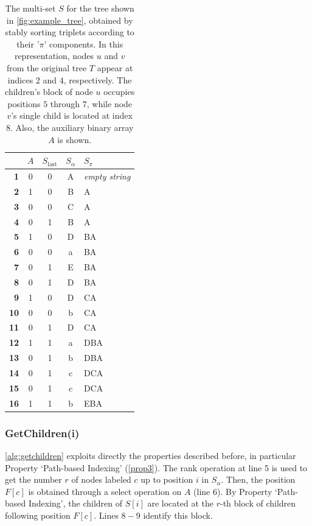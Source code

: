 \begin{table}
    \centering
    \begin{tabular}{r c c c l}
    \hline\hline
    \textbf{} & $A$ & \textbf{$S_{\text{last}}$} & \textbf{$S_{\alpha}$} & \textbf{$S_{\pi}$} \\
    \hline
    \textbf{1} & 0 & 0 & A & \textit{empty string} \\
    \textbf{2} & 1 & 0 & B & A \\
    \textbf{3} & 0 & 0 & C & A \\
    \textbf{4} & 0 & 1 & B & A \\
    \textbf{5} & 1 & 0 & D & BA \\
    \textbf{6} & 0 & 0 & a & BA \\
    \textbf{7} & 0 & 1 & E & BA \\
    \textbf{8} & 0 & 1 & D & BA \\
    \textbf{9} & 1 & 0 & D & CA \\
    \textbf{10} & 0 & 0 & b & CA \\
    \textbf{11} & 0 & 1 & D & CA \\
    \textbf{12} & 1 & 1 & a & DBA \\
    \textbf{13} & 0 & 1 & b & DBA \\
    \textbf{14} & 0 & 1 & c & DCA \\
    \textbf{15} & 0 & 1 & c & DCA \\
    \textbf{16} & 1 & 1 & b & EBA \\
    \hline\hline
    \end{tabular}
    \caption{The multi-set $S$ for the tree shown in \cref{fig:example_tree}, obtained by stably sorting triplets according to their '$\pi$' components. In this representation, nodes $u$ and $v$ from the original tree $T$ appear at indices $2$ and $4$, respectively. The children's block of node $u$ occupies positions $5$ through $7$, while node $v$'s single child is located at index $8$. Also, the auxiliary binary array $A$ is shown.}
    \label{tab:xbwt_example_2}
\end{table}

\subsubsection*{GetChildren(i)}
\cref{alg:getchildren} exploits directly the properties described before, in particular Property `Path-based Indexing' (\cref{prop3}). The rank operation at line 5 is used to get the number $r$ of nodes labeled $c$ up to position $i$ in $S_{\alpha}$. Then, the position $F[c]$ is obtained through a select operation on $A$ (line 6). By Property `Path-based Indexing', the children of $S[i]$ are located at the $r$-th block of children following position $F[c]$. Lines $8 - 9$ identify this block. 


